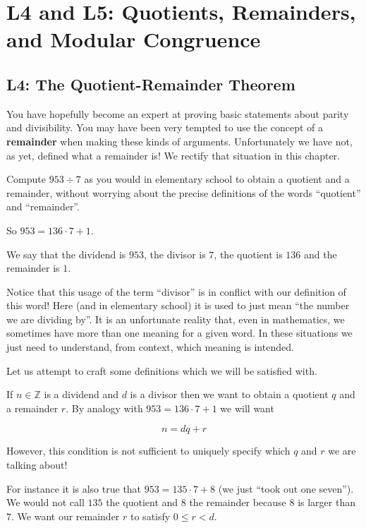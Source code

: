 \chapter{L4 and L5:  Quotients, Remainders, and Modular Congruence }

\section{L4:  The Quotient-Remainder Theorem}

You have hopefully become an expert at proving basic statements about parity and divisibility.  You may have been very tempted to use the concept of a \textbf{remainder} when making these kinds of arguments.  Unfortunately we have not, as yet, defined what a remainder is!  We rectify that situation in this chapter.

\begin{xca}
		Compute $953 \div 7$ as you would in elementary school to obtain a quotient and a remainder, without worrying about the precise definitions of the words ``quotient'' and ``remainder''.
	\end{xca}

\begin{solutions}
    
    So $953 = 136 \cdot 7 + 1$.
    
    We say that the dividend is $953$, the divisor is $7$, the quotient is $136$ and the remainder is $1$.
    
    Notice that this usage of the term ``divisor'' is in conflict with our definition of this word!  Here (and in elementary school) it is used to just mean ``the number we are dividing by''.  It is an unfortunate reality that, even in mathematics, we sometimes have more than one meaning for a given word.  In these situations we just need to understand, from context, which meaning is intended. 
	\end{solutions}

Let us attempt to craft some definitions which we will be satisfied with.

If $n \in \mathbb{Z}$ is a dividend and $d$ is a divisor then we want to obtain a quotient $q$ and a remainder $r$.  By analogy with $953 = 136 \cdot 7 + 1$ we will want

\[
n = dq + r
\]

However, this condition is not sufficient to uniquely specify which $q$ and $r$ we are talking about!

For instance it is also true that $953 = 135 \cdot 7 + 8$ (we just ``took out one seven'').  We would not call $135$ the quotient and $8$ the remainder because $8$ is larger than $7$.   We want our remainder $r$ to satisfy $0 \leq r < d$.


